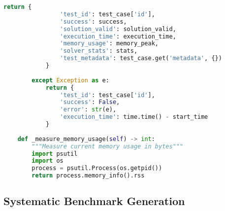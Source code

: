 \begin{lstlisting}[language=Python, caption=Core Testing Framework Implementation]
            return {
                'test_id': test_case['id'],
                'success': success,
                'solution_valid': solution_valid,
                'execution_time': execution_time,
                'memory_usage': memory_peak,
                'solver_stats': stats,
                'test_metadata': test_case.get('metadata', {})
            }
            
        except Exception as e:
            return {
                'test_id': test_case['id'],
                'success': False,
                'error': str(e),
                'execution_time': time.time() - start_time
            }
    
    def _measure_memory_usage(self) -> int:
        """Measure current memory usage in bytes"""
        import psutil
        import os
        process = psutil.Process(os.getpid())
        return process.memory_info().rss
\end{lstlisting}

\subsection{Systematic Benchmark Generation}
\label{appendix:benchmark-generation}

